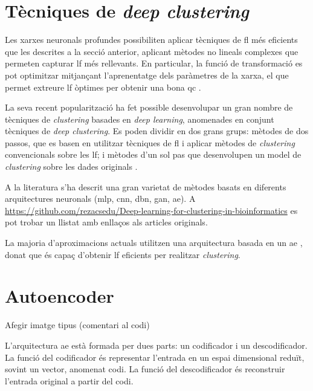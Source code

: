 \documentclass[CAT,BIB]{TFUOC}%
\newcommand{\todo}[1]{
            \begin{tcolorbox}[title=ToDo!, colback=red!5!white, colframe=red!50!black, coltext=red!50!black]
            #1
            \end{tcolorbox}}
\begin{document}
    \section{Tècniques de \textit{deep clustering}}
    \label{s:state_deep}

        Les xarxes neuronals profundes possibiliten aplicar tècniques de \gls{fl} més eficients que les descrites a la secció anterior, aplicant mètodes no lineals complexes que permeten capturar \gls{lf} més rellevants. En particular, la funció de transformació es pot optimitzar mitjançant l'aprenentatge dels paràmetres de la xarxa, el que permet extreure \gls{lf} òptimes per obtenir una bona \gls{qc} \citep{Karim2021}.

        La seva recent popularització ha fet possible desenvolupar un gran nombre de tècniques de \textit{clustering} basades en \textit{deep learning}, anomenades en conjunt tècniques de \textit{deep clustering}. Es poden dividir en dos grans grups: mètodes de dos passos, que es basen en utilitzar tècniques de \gls{fl} i aplicar mètodes de \textit{clustering} convencionals sobre les \gls{lf}; i mètodes d'un sol pas que desenvolupen un model de \textit{clustering} sobre les dades originals \citep{Karim2021}.

        A la literatura s'ha descrit una gran varietat de mètodes basats en diferents arquitectures neuronals (\gls{mlp}, \gls{cnn}, \gls{dbn}, \gls{gan}, \gls{ae}). A \url{https://github.com/rezacsedu/Deep-learning-for-clustering-in-bioinformatics} \citep{Karim2021} es pot trobar un llistat amb enllaços als articles originals.

        La majoria d'aproximacions actuals utilitzen una arquitectura basada en un \gls{ae} \citep{Karim2021}, donat que és capaç d'obtenir \gls{lf} eficients per realitzar \textit{clustering}.


    \section{Autoencoder}
    \label{s:state_ae}

\todo{Afegir imatge tipus (comentari al codi)
}

        L'arquitectura \gls{ae} està formada per dues parts: un codificador i un descodificador. La funció del codificador és representar l'entrada en un espai dimensional reduït, sovint un vector, anomenat codi. La funció del descodificador és reconstruir l'entrada original a partir del codi.
\end{document}

